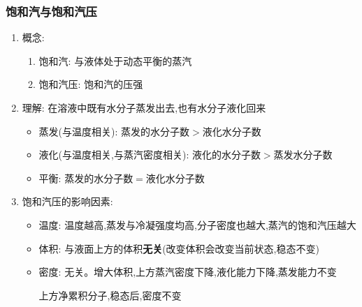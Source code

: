 \documentclass{article}
\begin{document}
\subsubsection{饱和汽与饱和汽压}
\begin{enumerate}
    \item 概念:
          \begin{enumerate}[label = (\arabic*)]
              \item 饱和汽: 与液体处于动态平衡的蒸汽
              \item 饱和汽压: 饱和汽的压强
          \end{enumerate}
    \item 理解: 在溶液中既有水分子蒸发出去,也有水分子液化回来
          \begin{itemize}
              \item 蒸发(与温度相关): 蒸发的水分子数$>$液化水分子数
              \item 液化(与温度相关,与蒸汽密度相关): 液化的水分子数$>$蒸发水分子数
              \item 平衡: 蒸发的水分子数$=$液化水分子数
          \end{itemize}
    \item 饱和汽压的影响因素:
          \begin{itemize}
              \item 温度: 温度越高,蒸发与冷凝强度均高,分子密度也越大,蒸汽的饱和汽压越大
              \item 体积: 与液面上方的体积\textbf{无关}(改变体积会改变当前状态,稳态不变)
              \item 密度: 无关。增大体积,上方蒸汽密度下降,液化能力下降,蒸发能力不变
              
              \hspace{2.7em}上方净累积分子,稳态后,密度不变
          \end{itemize}
\end{enumerate}

\vspace{2em}
\end{document}
